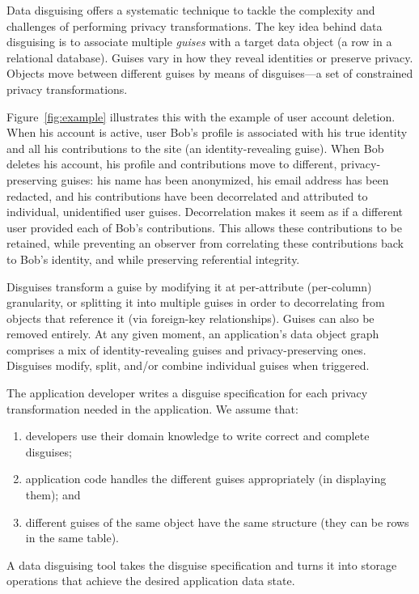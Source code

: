 Data disguising offers a systematic technique to tackle the complexity and challenges of performing
privacy transformations.
%
The key idea behind data disguising is to associate multiple \emph{guises} with a target data
object (\ie a row in a relational database). Guises vary in how they reveal identities or preserve privacy.
%
Objects move between different guises by means of disguises---a set of constrained privacy
transformations.

Figure~\ref{fig:example} illustrates this with the example of user account deletion.
%
When his account is active, user Bob's profile is associated with his true identity and all his
contributions to the site (an identity-revealing guise).
%
When Bob deletes his account, his profile and contributions move to different, privacy-preserving
guises: his name has been anonymized, his email address has been redacted, and his contributions
have been decorrelated and attributed to individual, unidentified user guises.
%
Decorrelation makes it seem as if a different user provided each of Bob's contributions. This allows
these contributions to be retained, while preventing an observer from correlating these
contributions back to Bob's identity, and while preserving referential integrity.

Disguises transform a guise by modifying it at per-attribute (\ie per-column) granularity, or
splitting it into multiple guises in order to decorrelating from objects that reference it (via \eg foreign-key relationships).
Guises can also be removed entirely. 
At any given moment, an application's data object graph comprises a mix of identity-revealing guises
and privacy-preserving ones. Disguises modify, split, and/or combine individual guises when triggered.

The application developer writes a disguise specification for each privacy transformation needed
in the application.
We assume that:
\begin{enumerate}[nosep]
  \item developers use their domain knowledge to write correct and complete disguises;
  \item application code handles the different guises appropriately (\eg in
    displaying them); and
  \item different guises of the same object have the same structure (\eg they can be
    rows in the same table).
\end{enumerate}
%
A data disguising tool takes the disguise specification and turns it into storage operations that
achieve the desired application data state.

